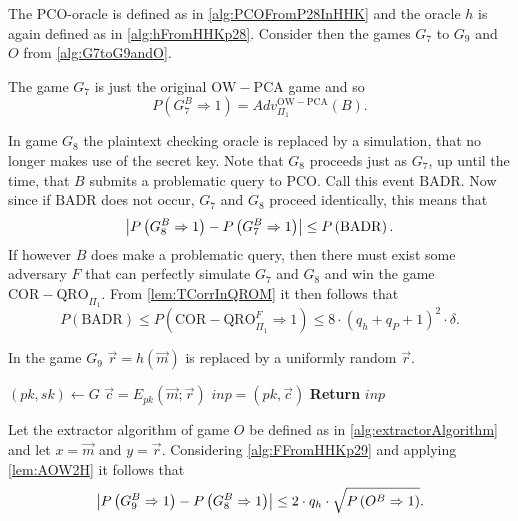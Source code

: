 %
The $\mathrm{PCO}$-oracle is defined as in \cref{alg:PCOFromP28InHHK} and the oracle $h$ is again defined as in \cref{alg:hFromHHKp28}. Consider then the games $G_7$ to $G_9$ and $O$ from \cref{alg:G7toG9andO}.

The game $G_7$ is just the original $\mathrm{OW-PCA}$ game and so
\[
	P\left( G_7^B \Rightarrow 1 \right) = Adv_{\Pi_1}^{\mathrm{OW-PCA}}\left(B\right).
\]

In game $G_8$ the plaintext checking oracle is replaced by a simulation, that no longer makes use of the secret key. Note that $G_8$ proceeds just as $G_7$, up until the time, that $B$ submits a problematic query to $\mathrm{PCO}$. Call this event \emph{$\mathrm{BADR}$}. Now since if $\mathrm{BADR}$ does not occur, $G_7$ and $G_8$ proceed identically, this means that
\[
	\left\vert P\left( G_8^B \Rightarrow 1 \right) - P\left( G_7^B \Rightarrow 1 \right)  \right\vert \leq P\left( \mathrm{BADR} \right) .
\]
If however $B$ does make a problematic query, then there must exist some adversary $F$ that can perfectly simulate $G_7$ and $G_8$ and win the game $\mathrm{COR-QRO}_{\Pi_1}$. From \cref{lem:TCorrInQROM} it then follows that
\[
	P\left( \mathrm{BADR} \right) \leq P\left( \mathrm{COR-QRO}^F_{\Pi_1} \Rightarrow 1 \right) \leq 8 \cdot \left( q_h + q_P + 1 \right) ^2 \cdot \delta .
\]

In the game $G_9$ $\vec{r} = h\left(\vec{m}\right)$ is replaced by a uniformly random $\vec{r}$.
%
\begin{center}
\begin{minipage}[ht!]{0.5\textwidth}
	\begin{algorithm}[H]
		\centering
		\caption{$\mathrm{F}\left(\vec{m}, \vec{r}\right)$}
		\label{alg:FFromHHKp29}
		\begin{algorithmic}
			\State $\left(pk, sk\right) \leftarrow G$
			\State $\vec{c} = E_{pk}\left( \vec{m}; \vec{r}\right)$
			\State $\mathit{inp} = \left(pk, \vec{c}\right)$
			\State \textbf{Return} $\mathit{inp}$
		\end{algorithmic}
	\end{algorithm}
\end{minipage}
\end{center}
%
Let the extractor algorithm of game $O$ be defined as in \cref{alg:extractorAlgorithm} and let $x = \vec{m}$ and $y = \vec{r}$. Considering \cref{alg:FFromHHKp29} and applying \cref{lem:AOW2H} it follows that
\[
	\left\vert P\left( G_9^B \Rightarrow 1 \right) - P\left( G_8^B \Rightarrow 1 \right) \right\vert \leq 2 \cdot q_h \cdot \sqrt{P\left( O^B \Rightarrow 1 \right)}.
\]

